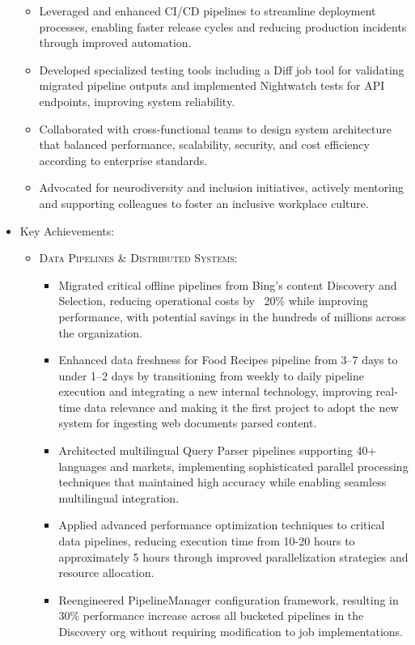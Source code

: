 \begin{itemize}
\begin{itemize}
        \item \scriptsize{Leveraged and enhanced CI/CD pipelines to streamline deployment processes, enabling faster release cycles and reducing production incidents through improved automation.}
        \item \scriptsize{Developed specialized testing tools including a Diff job tool for validating migrated pipeline outputs and implemented Nightwatch tests for API endpoints, improving system reliability.}
        \item \scriptsize{Collaborated with cross-functional teams to design system architecture that balanced performance, scalability, security, and cost efficiency according to enterprise standards.}
        \item \scriptsize{Advocated for neurodiversity and inclusion initiatives, actively mentoring and supporting colleagues to foster an inclusive workplace culture.}
    \end{itemize}
    \item \footnotesize{Key Achievements:}
    \begin{itemize}
        \item \scriptsize{\textsc{Data Pipelines \& Distributed Systems:}}
        \begin{itemize}
            \item \scriptsize{Migrated critical offline pipelines from Bing's content Discovery and Selection, reducing operational costs by ~20\% while improving performance, with potential savings in the hundreds of millions across the organization.}
            \item \scriptsize{Enhanced data freshness for Food Recipes pipeline from 3–7 days to under 1–2 days by transitioning from weekly to daily pipeline execution and integrating a new internal technology, improving real-time data relevance and making it the first project to adopt the new system for ingesting web documents parsed content.}
            \item \scriptsize{Architected multilingual Query Parser pipelines supporting 40+ languages and markets, implementing sophisticated parallel processing techniques that maintained high accuracy while enabling seamless multilingual integration.}
            \item \scriptsize{Applied advanced performance optimization techniques to critical data pipelines, reducing execution time from 10-20 hours to approximately 5 hours through improved parallelization strategies and resource allocation.}
            \item \scriptsize{Reengineered PipelineManager configuration framework, resulting in 30\% performance increase across all bucketed pipelines in the Discovery org without requiring modification to job implementations.}

\end{itemize}
\end{itemize}
\end{itemize}
